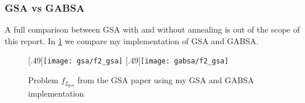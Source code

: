 \subsubsection*{GSA vs GABSA}
A full comparison between GSA with and without annealing is out of the scope of this report. In \cref{fig:f2comp} we compare my implementation of GSA and GABSA.
%
\begin{figure}
	\centering
		[.49\linewidth]{\texttt{[image: gsa/f2\_gsa]}}
		[.49\linewidth]{\texttt{[image: gabsa/f2\_gsa]}}
	\caption{Problem $f_{2_{gsa}}$ from the GSA paper\cite{GSA} using my GSA and GABSA implementation}
    \label{fig:f2comp}
\end{figure}
